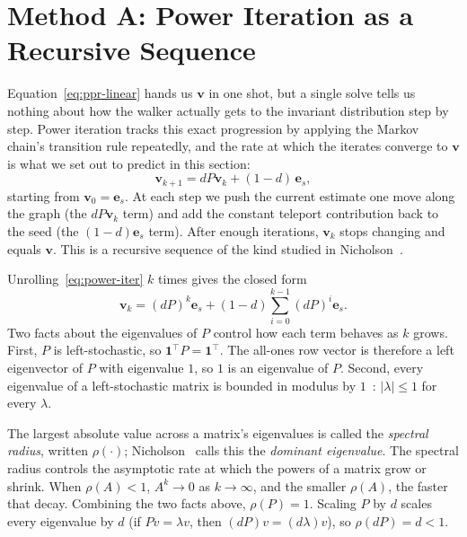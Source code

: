 \documentclass[conference]{IEEEtran}
\begin{document}
\section{Method A: Power Iteration as a Recursive Sequence}
\label{sec:method-a}

Equation~\eqref{eq:ppr-linear} hands us $\mathbf{v}$ in one
shot, but a single solve tells us nothing about how the walker
actually gets to the invariant distribution step by step.
Power iteration tracks this exact progression by applying the
Markov chain's transition rule repeatedly, and the rate at
which the iterates converge to $\mathbf{v}$ is what we set
out to predict in this section:
\begin{equation}
  \mathbf{v}_{k+1} = dP\mathbf{v}_k + (1-d)\,\mathbf{e}_s,
  \label{eq:power-iter}
\end{equation}
starting from $\mathbf{v}_0 = \mathbf{e}_s$. At each step we push
the current estimate one move along the graph (the $dP\mathbf{v}_k$
term) and add the constant teleport contribution back to the seed
(the $(1-d)\mathbf{e}_s$ term). After enough iterations,
$\mathbf{v}_k$ stops changing and equals $\mathbf{v}$. This is a
recursive sequence of the kind studied in
Nicholson~\cite{nicholson2018linear}.

Unrolling~\eqref{eq:power-iter} $k$ times gives the closed form
\begin{equation}
  \mathbf{v}_k = (dP)^k \mathbf{e}_s
    + (1-d) \sum_{i=0}^{k-1} (dP)^i \mathbf{e}_s.
  \label{eq:power-closed}
\end{equation}
Two facts about the eigenvalues of $P$ control how each term
behaves as $k$ grows. First, $P$ is left-stochastic, so
$\mathbf{1}^\top P = \mathbf{1}^\top$. The all-ones row vector is
therefore a left eigenvector of $P$ with eigenvalue $1$, so $1$
is an eigenvalue of $P$. Second, every eigenvalue of a left-stochastic
matrix is bounded in modulus by
$1$~\cite{langville2004deeper}: $|\lambda| \leq 1$ for every
$\lambda$.

The largest absolute value across a matrix's eigenvalues is
called the \emph{spectral radius}, written $\rho(\cdot)$;
Nicholson~\cite{nicholson2018linear} calls this the
\emph{dominant eigenvalue}. The spectral radius
controls the asymptotic rate at which the powers of a matrix
grow or shrink. When $\rho(A) < 1$, $A^k \to 0$ as $k \to
\infty$, and the smaller $\rho(A)$, the faster that decay.
Combining the two facts above, $\rho(P) = 1$. Scaling $P$ by $d$
scales every eigenvalue by $d$ (if $Pv = \lambda v$, then $(dP)v
= (d\lambda)v$), so $\rho(dP) = d < 1$.
\end{document}
